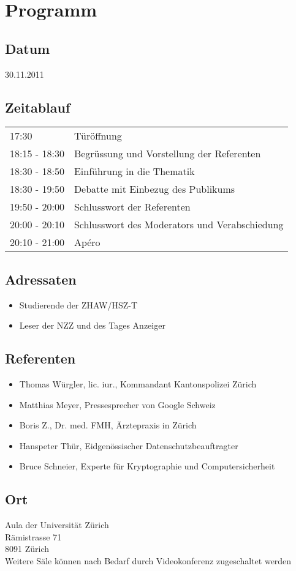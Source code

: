 \section{Programm}
\subsection*{Datum}
30.11.2011

\subsection*{Zeitablauf}
\begin{tabular}{ll}
17:30	& Türöffnung\\
18:15 - 18:30 & Begrüssung und Vorstellung der Referenten \\
18:30 - 18:50 & Einführung in die Thematik \\
18:30 - 19:50 & Debatte mit Einbezug des Publikums\\
19:50 - 20:00 & Schlusswort der Referenten\\
20:00 - 20:10 & Schlusswort des Moderators und Verabschiedung\\
20:10 - 21:00 & Apéro\\
\end{tabular}

\subsection*{Adressaten}
\begin{itemize}
 \item Studierende der ZHAW/HSZ-T
 \item Leser der NZZ und des Tages Anzeiger
\end{itemize}


\subsection*{Referenten}
\begin{itemize}
\item Thomas Würgler, lic. iur., Kommandant Kantonspolizei Zürich
\item Matthias Meyer, Pressesprecher von Google Schweiz
\item Boris Z., Dr. med. FMH, Ärztepraxis in Zürich
\item Hanspeter Thür, Eidgenössischer Datenschutzbeauftragter
\item Bruce Schneier, Experte für Kryptographie und Computersicherheit
\end{itemize}

\subsection*{Ort}
Aula der Universität Zürich\\
Rämistrasse 71\\
8091 Zürich \\
\newline
Weitere Säle können nach Bedarf durch Videokonferenz zugeschaltet werden
